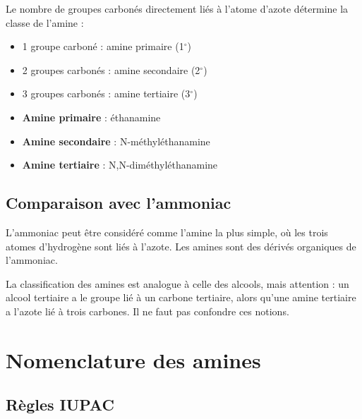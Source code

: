 \begin{propriete}
Le nombre de groupes carbonés directement liés à l'atome d'azote détermine la classe de l'amine :
\begin{itemize}
    \item 1 groupe carboné : amine primaire (1$^\circ$)
    \item 2 groupes carbonés : amine secondaire (2$^\circ$)
    \item 3 groupes carbonés : amine tertiaire (3$^\circ$)
\end{itemize}
\end{propriete}

\begin{exemple}
\begin{itemize}
    \item \textbf{Amine primaire} : éthanamine 
    \item \textbf{Amine secondaire} : N-méthyléthanamine 
    \item \textbf{Amine tertiaire} : N,N-diméthyléthanamine 
\end{itemize}
\end{exemple}

\subsection{Comparaison avec l'ammoniac}

L'ammoniac  peut être considéré comme l'amine la plus simple, où les trois atomes d'hydrogène sont liés à l'azote. Les amines sont des dérivés organiques de l'ammoniac.

\begin{remarque}
La classification des amines est analogue à celle des alcools, mais attention : un alcool tertiaire a le groupe  lié à un carbone tertiaire, alors qu'une amine tertiaire a l'azote lié à trois carbones. Il ne faut pas confondre ces notions.
\end{remarque}

\section{Nomenclature des amines}

\subsection{Règles IUPAC}

